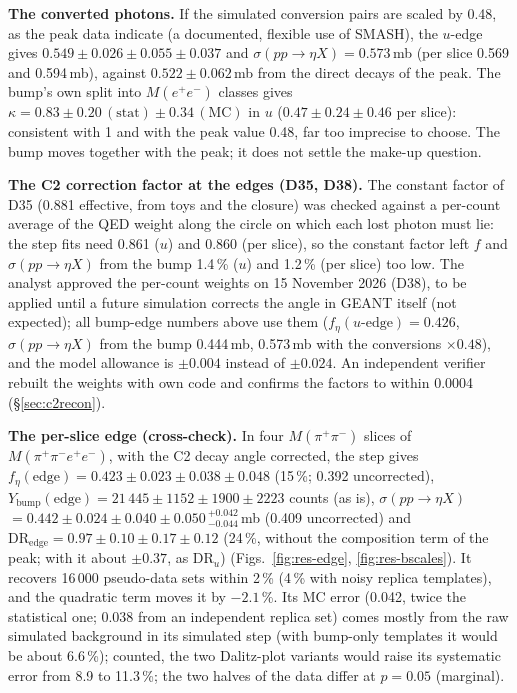 \documentclass[11pt,a4paper]{article}
\newcommand{\Mfour}{\ensuremath{M(\pi^{+}\pi^{-}e^{+}e^{-})}\xspace}
\newcommand{\Mee}{\ensuremath{M(e^{+}e^{-})}\xspace}
\newcommand{\Mpipi}{\ensuremath{M(\pi^{+}\pi^{-})}\xspace}
\newcommand{\Ybump}{\ensuremath{Y_{\mathrm{bump}}}\xspace}
\newcommand{\sigeta}{\ensuremath{\sigma(pp\to\eta X)}\xspace}
\begin{document}
\textbf{The converted photons.} If the simulated conversion pairs are scaled by 0.48, as the peak data indicate (a documented, flexible use of
SMASH), the $u$-edge gives $0.549\pm0.026\pm0.055\pm0.037$ and $\sigeta=0.573$\,mb (per slice 0.569 and 0.594\,mb), against $0.522\pm0.062$\,mb
from the direct decays of the peak. The bump's own split into \Mee classes gives $\kappa=0.83\pm0.20\,(\mathrm{stat})\pm0.34\,(\mathrm{MC})$ in $u$
($0.47\pm0.24\pm0.46$ per slice): consistent with 1 and with the peak value 0.48, far too imprecise to choose. The bump moves together with the
peak; it does not settle the make-up question.

\textbf{The C2 correction factor at the edges (D35, D38).} The constant factor of D35 (0.881 effective, from toys and the closure) was checked
against a per-count average of the QED weight along the circle on which each lost photon must lie: the step fits need 0.861 ($u$) and 0.860
(per slice), so the constant factor left $f$ and \sigeta from the bump 1.4\,\% ($u$) and 1.2\,\% (per slice) too low. The analyst approved the
per-count weights on 15 November 2026 (D38), to be applied until a future simulation corrects the angle in GEANT itself (not expected); all
bump-edge numbers above use them ($f_\eta(u\text{-edge})=0.426$, \sigeta from the bump 0.444\,mb, 0.573\,mb with the conversions $\times0.48$),
and the model allowance is $\pm0.004$ instead of $\pm0.024$. An independent verifier rebuilt the weights with own code and confirms the factors to
within 0.0004 (\S\ref{sec:c2recon}).

\textbf{The per-slice edge (cross-check).} In four \Mpipi slices of \Mfour, with the C2 decay angle corrected, the step gives
$f_\eta(\mathrm{edge})=0.423\pm0.023\pm0.038\pm0.048$ (15\,\%; 0.392 uncorrected), $\Ybump(\mathrm{edge})=21\,445\pm1152\pm1900\pm2223$ counts
(as is), \sigeta $=0.442\pm0.024\pm0.040\pm0.050\,^{+0.042}_{-0.044}$\,mb (0.409 uncorrected) and
$\mathrm{DR}_{\mathrm{edge}}=0.97\pm0.10\pm0.17\pm0.12$ (24\,\%, without the composition term of the peak; with it about $\pm0.37$, as
DR$_u$) (Figs.~\ref{fig:res-edge}, \ref{fig:res-bscales}). It recovers 16\,000 pseudo-data sets within 2\,\% (4\,\% with noisy replica
templates), and the quadratic term moves it by $-2.1$\,\%. Its MC error (0.042, twice the statistical one; 0.038 from an independent replica set)
comes mostly from the raw simulated background in its simulated step (with bump-only templates it would be about 6.6\,\%); counted, the
two Dalitz-plot variants would raise its systematic error from 8.9 to 11.3\,\%; the two halves of the data differ at $p=0.05$ (marginal).
\end{document}
